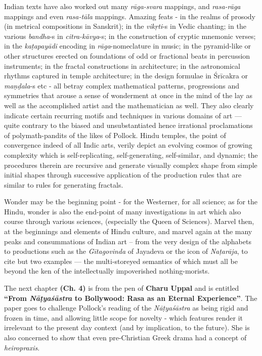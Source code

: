 Indian texts have also worked out many \textsl{rāga-svara} mappings, and \textsl{rasa-rāga} mappings and even \textsl{rasa-tāla} mappings. Amazing feats - in the realms of prosody (in metrical compositions in Sanskrit); in the \textsl{vikṛti}-s in Vedic chanting; in the various \textsl{bandha}-s in \textsl{citra-kāvya}-s; in the construction of cryptic mnemonic verses; in the \textsl{kaṭapayādi} encoding in \textsl{rāga}-nomeclature in music; in the pyramid-like or other structures erected on foundations of odd or fractional beats in percussion instruments; in the fractal constructions in architecture; in the  astronomical rhythms captured in temple architecture; in the design formulae in Śrīcakra or \textsl{maṇḍala}-s etc - all betray complex mathematical patterns, progressions and symmetries that arouse a sense of wonderment at once in the mind of the lay as well as the accomplished artist and the mathematician as well. They also clearly indicate certain recurring motifs and techniques in various domains of art --- quite contrary to the biased and unsubstantiated hence irrational proclamations of polymath-pandits of the likes of Pollock. Hindu temples, the point of convergence indeed of all Indic arts, verily depict an evolving cosmos of growing complexity which is self-replicating, self-generating, self-similar, and dynamic; the procedures therein are recursive and generate visually complex shape from simple initial shapes through successive application of the production rules that are similar to rules for generating fractals.

Wonder may be the beginning point - for the Westerner, for all science; as for the Hindu, wonder is also the end-point of many investigations in art which also course through various sciences, (especially the Queen of Sciences). Marvel then, at the beginnings and elements of Hindu culture, and marvel again at the many peaks and consummations of Indian art – from the very design of the alphabets to productions such as the \textsl{Gītagovinda} of Jayadeva or the icon of \textsl{Naṭarāja}, to cite but two examples --- the multi-storeyed semantics of which must all be beyond the ken of the intellectually impoverished nothing-morists.

The next chapter {\bf(Ch. 4)} is from the pen of {\bf Charu Uppal} and is entitled {\bf “From \textsl{Nāṭyaśāstra} to Bollywood: Rasa as an Eternal Experience”}. The paper goes to challenge Pollock’s reading of the \textsl{Nāṭyaśāstra} as being rigid and frozen in time, and allowing little scope for novelty - which features render it irrelevant to the present day context (and by implication, to the future). She is also concerned to show that even pre-Christian Greek drama had a concept of \textsl{heiropraxis}.

